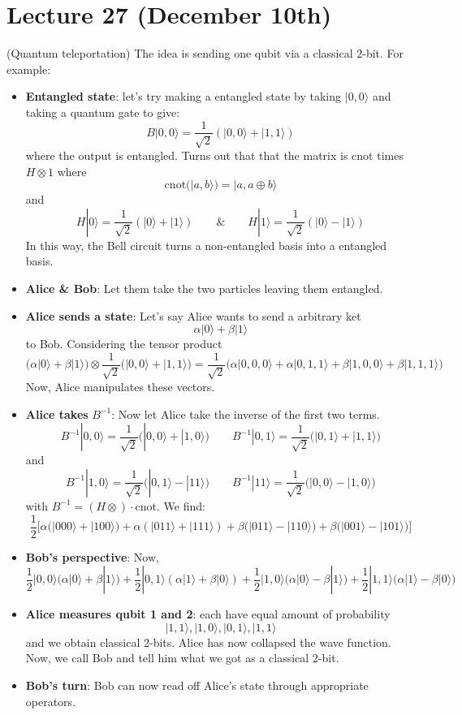 \section{Lecture 27 (December 10th)}
\begin{defi}
(Quantum teleportation) The idea is sending one qubit via a classical $2$-bit. For example:
\begin{itemize}
\item[(i)] {\bf Entangled state}: let's try making a entangled state by taking $|0,0\rangle $ and taking a quantum gate to give:
\[B|0,0\rangle =\dfrac{1}{\sqrt{2}}(|0,0\rangle +|1,1\rangle )\]
where the output is entangled. Turns out that that the matrix is cnot times $H\otimes \mathrm{1}$ where
\[\mathrm{cnot}(|a,b\rangle )=|a,a\oplus b\rangle \]
and
\[H|0\rangle =\dfrac{1}{\sqrt{2}}(|0\rangle +|1\rangle )\qquad\&\qquad H|1\rangle=\dfrac{1}{\sqrt{2}}(|0\rangle -|1\rangle ) \]
In this way, the Bell circuit turns a non-entangled basis into a entangled basis.
\item[(ii)] {\bf Alice \& Bob}: Let them take the two particles leaving them entangled.
\item[(iii)] {\bf Alice sends a state}: Let's say Alice wants to send a arbitrary ket
\[\alpha |0\rangle+ \beta |1\rangle \]
to Bob. Considering the tensor product
\[\big(\alpha |0\rangle +\beta |1\rangle \big)\otimes \dfrac{1}{\sqrt{2}}\big(|0,0\rangle +|1,1\rangle \big)=\dfrac{1}{\sqrt{2}}\big(\alpha |0,0,0\rangle +\alpha |0,1,1\rangle +\beta |1,0,0\rangle +\beta |1,1,1\rangle \big) \]
Now, Alice manipulates these vectors.
\item[(iv)] {\bf Alice takes} $B^{-1}$: Now let Alice take the inverse of the first two terms.
\[B^{-1}|0,0\rangle =\dfrac{1}{\sqrt{2}}\big(|0,0\rangle +|1,0\rangle \big)\qquad B^{-1}|0,1\rangle =\dfrac{1}{\sqrt{2}}\big(|0,1\rangle +|1,1\rangle \big)
\]
and
\[B^{-1}|1,0\rangle =\dfrac{1}{\sqrt{2}}\big(|0,1\rangle -|11\rangle \big)\qquad B^{-1}|11\rangle =\dfrac{1}{\sqrt{2}}\big(|0,0\rangle -|1,0\rangle \big)\]
with $B^{-1}=(H\otimes )\cdot \mathrm{cnot}$. We find:
\[\dfrac{1}{2}\big[\alpha \big(|000\rangle +|100\rangle \big)+\alpha (|011\rangle +|111\rangle )+\beta \big(|011\rangle -|110\rangle \big)+\beta \big(|001\rangle -|101\rangle \big)\big]\]
\item[(v)] {\bf Bob's perspective}: Now,
\[\dfrac{1}{2}|0,0\rangle\big(\alpha |0\rangle +\beta |1\rangle \big)+\dfrac{1}{2}|0,1\rangle (\alpha |1\rangle +\beta |0\rangle )+\dfrac{1}{2}|1,0\rangle \big(\alpha |0\rangle -\beta |1\rangle \big)+\dfrac{1}{2}|1,1\rangle \big(\alpha |1\rangle -\beta |0\rangle \big)\]
\item[(vi)] {\bf Alice measures qubit 1 and 2}: each have equal amount of probability 
\[|1,1\rangle ,|1,0\rangle ,|0,1\rangle ,|1,1\rangle \]
and we obtain classical 2-bits. Alice has now collapsed the wave function. Now, we call Bob and tell him what we got as a classical 2-bit. 
\item[(vii)] {\bf Bob's turn}: Bob can now read off Alice's state through appropriate operators. 
\end{itemize}
\end{defi}
